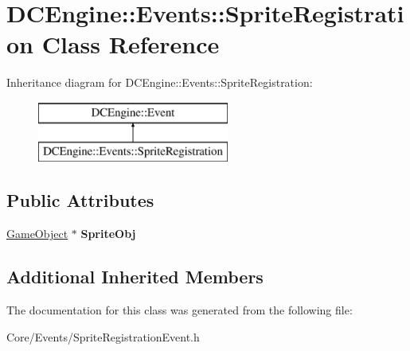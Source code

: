 \hypertarget{classDCEngine_1_1Events_1_1SpriteRegistration}{\section{D\-C\-Engine\-:\-:Events\-:\-:Sprite\-Registration Class Reference}
\label{classDCEngine_1_1Events_1_1SpriteRegistration}
}
Inheritance diagram for D\-C\-Engine\-:\-:Events\-:\-:Sprite\-Registration\-:\begin{figure}[H]
\begin{center}
\leavevmode
\includegraphics[height=2.000000cm]{classDCEngine_1_1Events_1_1SpriteRegistration}
\end{center}
\end{figure}
\subsection*{Public Attributes}
\begin{DoxyCompactItemize}
\item 
\hypertarget{classDCEngine_1_1Events_1_1SpriteRegistration_ae5c02f245686583bc7866b2aeccc4482}{\hyperlink{classDCEngine_1_1GameObject}{Game\-Object} $\ast$ {\bfseries Sprite\-Obj}}\label{classDCEngine_1_1Events_1_1SpriteRegistration_ae5c02f245686583bc7866b2aeccc4482}

\end{DoxyCompactItemize}
\subsection*{Additional Inherited Members}


The documentation for this class was generated from the following file\-:\begin{DoxyCompactItemize}
\item 
Core/\-Events/Sprite\-Registration\-Event.\-h\end{DoxyCompactItemize}
